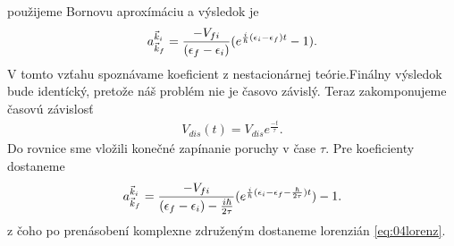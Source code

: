 použijeme Bornovu aproxímáciu a výsledok je
\begin{align}
\label{eq:04coef_nonstac}
a^{\vec{k}_i}_{\vec{k}_f}=\frac{-V_{fi}}{(\epsilon_f-\epsilon_i)}(e^{\frac{i}{\hbar}(\epsilon_i-\epsilon_f)t}-1)\text{.}
\end{align}
V tomto vzťahu spoznávame koeficient z nestacionárnej teórie.Finálny výsledok bude identícký, pretože náš problém nie je časovo závislý. Teraz zakomponujeme časovú  závislosť
\begin{align}
V_{dis}(t)=V_{dis}e^{\frac{-t}{\tau}} \text{.}
\end{align}
Do rovnice sme vložili konečné zapínanie poruchy v čase $\tau$. Pre koeficienty dostaneme
\begin{align}
\label{eq:04coef_nonstac2}
a^{\vec{k}_i}_{\vec{k}_f}=\frac{-V_{fi}}{(\epsilon_f-\epsilon_i)-\frac{i\hbar}{2\tau}}(e^{\frac{i}{\hbar}(\epsilon_i-\epsilon_f-\frac{\hbar}{2\tau})t})-1\text{.}
\end{align}
z čoho po prenásobení komplexne združeným dostaneme lorenzián \eqref{eq:04lorenz}.

